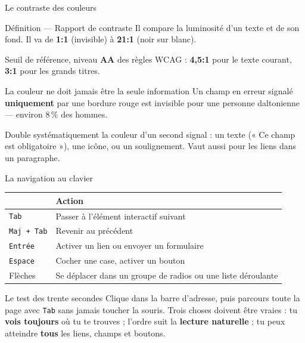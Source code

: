 \documentclass[aspectratio=169,11pt]{beamer}
\newcommand{\hdr}[1]{\multicolumn{1}{l}{\color{white}\bfseries #1}}
\begin{document}
\begin{frame}{Le contraste des couleurs}
  \begin{block}{Définition --- Rapport de contraste}
    Il compare la luminosité d'un texte et de son fond. Il va de \textbf{1:1} (invisible) à \textbf{21:1} (noir sur blanc).
    \vspace{0.1cm}

    Seuil de référence, niveau \textbf{AA} des règles WCAG : \textbf{4{,}5:1} pour le texte courant, \textbf{3:1} pour les grands titres.
  \end{block}
  \vspace{0.25cm}
  \begin{alertblock}{La couleur ne doit jamais être la seule information}
    Un champ en erreur signalé \textbf{uniquement} par une bordure rouge est invisible pour une personne daltonienne --- environ 8\,\% des hommes.
    \vspace{0.15cm}

    Double systématiquement la couleur d'un second signal : un texte (« Ce champ est obligatoire »), une icône, ou un soulignement. Vaut aussi pour les liens dans un paragraphe.
  \end{alertblock}
\end{frame}

\begin{frame}{La navigation au clavier}
  \vspace{0.1cm}
  \begin{center}
  \small
  \begin{tabularx}{0.95\textwidth}{lX}
    \toprule
    \rowcolor{accentBlue}
    \hdr{Touche} & \hdr{Action} \\
    \midrule
    \rowcolor{cfptGrey}
    \texttt{Tab} & Passer à l'élément interactif suivant \\
    \texttt{Maj + Tab} & Revenir au précédent \\
    \rowcolor{cfptGrey}
    \texttt{Entrée} & Activer un lien ou envoyer un formulaire \\
    \texttt{Espace} & Cocher une case, activer un bouton \\
    \rowcolor{cfptGrey}
    Flèches & Se déplacer dans un groupe de radios ou une liste déroulante \\
    \bottomrule
  \end{tabularx}
  \end{center}
  \vspace{0.25cm}
  \begin{exampleblock}{Le test des trente secondes}
    Clique dans la barre d'adresse, puis parcours toute la page avec \texttt{Tab} sans jamais toucher la souris. Trois choses doivent être vraies : tu \textbf{vois toujours} où tu te trouves ; l'ordre suit la \textbf{lecture naturelle} ; tu peux atteindre \textbf{tous} les liens, champs et boutons.
  \end{exampleblock}
\end{frame}
\end{document}
